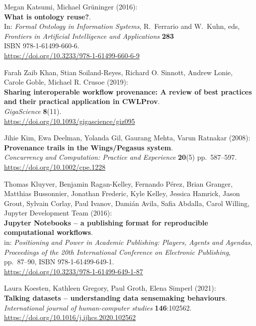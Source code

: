 \begin{thebibliography}{9}
Megan Katsumi, Michael Grüninger (2016):\\
\textbf{What is ontology reuse?}.\\
In: \emph{Formal Ontology in Information Systems}, R.~Ferrario and
W.~Kuhn, eds,\\
\emph{Frontiers in Artificial Intelligence and Applications}
\textbf{283}\\
ISBN 978-1-61499-660-6.\\
\url{https://doi.org/10.3233/978-1-61499-660-6-9}

Farah Zaib Khan, Stian Soiland-Reyes, Richard O. Sinnott,
Andrew Lonie, Carole Goble, Michael R. Crusoe (2019):\\
\textbf{Sharing interoperable workflow provenance: A review of best
practices and their practical application in CWLProv}.\\
\emph{GigaScience} \textbf{8}(11).\\
\url{https://doi.org/10.1093/gigascience/giz095}

Jihie Kim, Ewa Deelman, Yolanda Gil, Gaurang Mehta, Varun
Ratnakar (2008):\\
\textbf{Provenance trails in the Wings/Pegasus system}.\\
\emph{Concurrency and Computation: Practice and Experience}
\textbf{20}(5) pp.~587--597.\\
\url{https://doi.org/10.1002/cpe.1228}

Thomas Kluyver, Benjamin Ragan-Kelley, Fernando Pérez, Brian
Granger, Matthias Bussonnier, Jonathan Frederic, Kyle Kelley, Jessica
Hamrick, Jason Grout, Sylvain Corlay, Paul Ivanov, Damián Avila, Safia
Abdalla, Carol Willing, Jupyter Development Team (2016):\\
\textbf{Jupyter Notebooks -- a publishing format for reproducible
computational workflows}.\\
in: \emph{Positioning and Power in Academic Publishing: Players, Agents
and Agendas},\\
\emph{Proceedings of the 20th International Conference on Electronic
Publishing}, pp.~87--90, ISBN 978-1-61499-649-1.\\
\url{https://doi.org/10.3233/978-1-61499-649-1-87}

Laura Koesten, Kathleen Gregory, Paul Groth, Elena Simperl
(2021):\\
\textbf{Talking datasets -- understanding data sensemaking
behaviours}.\\
\emph{International journal of human-computer studies}
\textbf{146}:102562.\\
\url{https://doi.org/10.1016/j.ijhcs.2020.102562}


\end{thebibliography}
